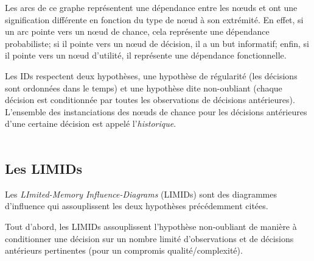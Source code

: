 \documentclass[12pt]{article}
\begin{document}
Les arcs de ce graphe représentent une dépendance entre les nœuds et ont une signification différente en fonction du type de nœud à son extrémité.
En effet, si un arc pointe vers un nœud de chance, cela représente une dépendance probabiliste; si il pointe vers un nœud de décision, il a un but informatif; enfin, si il pointe vers un nœud d'utilité, il représente une dépendance fonctionnelle.

\bigbreak
Les IDs respectent deux hypothèses, une hypothèse de régularité (les décisions sont ordonnées dans le temps) et une hypothèse dite non-oubliant (chaque décision est conditionnée par toutes les observations de décisions antérieures).
L'ensemble des instanciations des nœuds de chance pour les décisions antérieures d'une certaine décision est appelé l'\textit{historique}.
\\\\


\subsection{Les LIMIDs}
Les \textit{LImited-Memory Influence-Diagrams} (LIMIDs) sont des diagrammes d'influence qui assouplissent les deux hypothèses précédemment citées. 
 
Tout d'abord, les LIMIDs assouplissent l'hypothèse non-oubliant de manière à conditionner une décision sur un nombre limité d'observations et de décisions antérieurs pertinentes (pour un compromis qualité/complexité).
\end{document}
